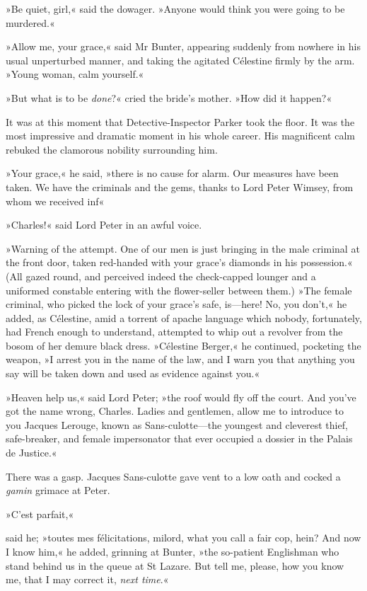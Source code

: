»Be quiet, girl,« said the dowager. »Anyone would think you were going to be murdered.«

»Allow me, your grace,« said Mr Bunter, appearing suddenly from nowhere in his usual unperturbed manner, and taking the agitated Célestine firmly by the arm. »Young woman, calm yourself.«

»But what is to be \textit{done}?« cried the bride's mother. »How did it happen?«

It was at this moment that Detective-Inspector Parker took the floor. It was the most impressive and dramatic moment in his whole career. His magnificent calm rebuked the clamorous nobility surrounding him.

»Your grace,« he said, »there is no cause for alarm. Our measures have been taken. We have the criminals and the gems, thanks to Lord Peter Wimsey, from whom we received inf\longdash«

»Charles!« said Lord Peter in an awful voice.

»Warning of the attempt. One of our men is just bringing in the male criminal at the front door, taken red-handed with your grace's diamonds in his possession.« (All gazed round, and perceived indeed the check-capped lounger and a uniformed constable entering with the flower-seller between them.) »The female criminal, who picked the lock of your grace's safe, is—here! No, you don't,« he added, as Célestine, amid a torrent of apache language which nobody, fortunately, had French enough to understand, attempted to whip out a revolver from the bosom of her demure black dress. »Célestine Berger,« he continued, pocketing the weapon, »I arrest you in the name of the law, and I warn you that anything you say will be taken down and used as evidence against you.«

»Heaven help us,« said Lord Peter; »the roof would fly off the court. And you've got the name wrong, Charles. Ladies and gentlemen, allow me to introduce to you Jacques Lerouge, known as Sans-culotte—the youngest and cleverest thief, safe-breaker, and female impersonator that ever occupied a dossier in the Palais de Justice.«

There was a gasp. Jacques Sans-culotte gave vent to a low oath and cocked a \textit{gamin} grimace at Peter.

\begin{french}»C'est parfait,«\end{french} said he; »toutes mes félicitations, milord, what you call a fair cop, hein? And now I know him,« he added, grinning at Bunter, »the so-patient Englishman who stand behind us in the queue at St Lazare. But tell me, please, how you know me, that I may correct it, \textit{next time}.«


